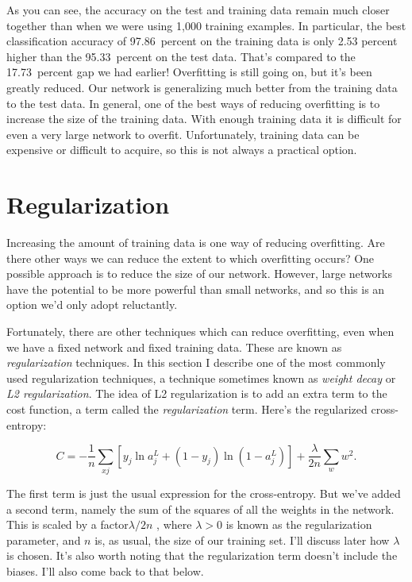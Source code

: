 As you can see, the accuracy on the test and training data remain much closer together than when we were using 1,000 training examples. In particular, the best classification accuracy of 97.86~percent on the training data is only 2.53 percent higher than the 95.33~percent on the test data. That's compared to the 17.73~percent gap we had earlier! Overfitting is still going on, but it's been greatly reduced. Our network is generalizing much better from the training data to the test data. In general, one of the best ways of reducing overfitting is to increase the size of the training data. With enough training data it is difficult for even a very large network to overfit. Unfortunately, training data can be expensive or difficult to acquire, so this is not always a practical option.


\section{Regularization}
\label{sec:nielsenRegularization}
Increasing the amount of training data is one way of reducing overfitting. Are there other ways we can reduce the extent to which overfitting occurs? One possible approach is to reduce the size of our network. However, large networks have the potential to be more powerful than small networks, and so this is an option we'd only adopt reluctantly.

Fortunately, there are other techniques which can reduce overfitting, even when we have a fixed network and fixed training data. These are known as \textit{regularization} techniques. In this section I describe one of the most commonly used regularization techniques, a technique sometimes known as \textit{weight decay} or \textit{L2 regularization}. The idea of L2 regularization is to add an extra term to the cost function, a term called the \textit{regularization} term. Here's the regularized cross-entropy:

\begin{equation}
C=-\frac{1}{n} \sum_{x j}\left[y_{j} \ln a_{j}^{L}+\left(1-y_{j}\right) \ln \left(1-a_{j}^{L}\right)\right]+\frac{\lambda}{2 n} \sum_{w} w^{2}.
\label{eq:c03-85} 
\end{equation}

The first term is just the usual expression for the cross-entropy. But we've added a second term, namely the sum of the squares of all the weights in the network. This is scaled by a factor$\lambda / 2 n$ , where $\lambda>0$ is known as the regularization parameter, and $n$ is, as usual, the size of our training set. I'll discuss later how $\lambda$ is chosen. It's also worth noting that the regularization term doesn't include the biases. I'll also come back to that below.

